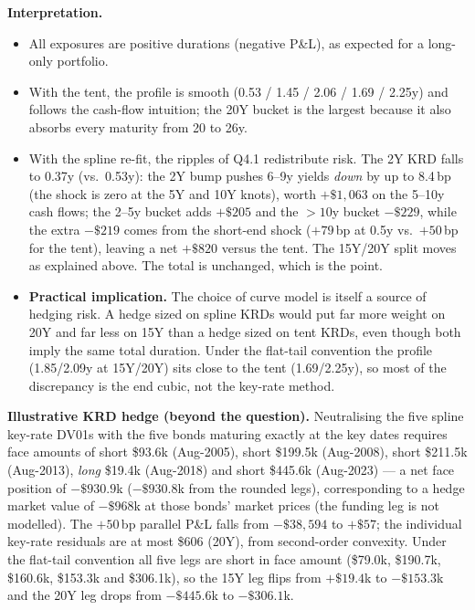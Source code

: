 \documentclass[11pt]{article}
\begin{document}
\textbf{Interpretation.}
\begin{itemize}[nosep]
\item All exposures are positive durations (negative P\&L), as expected for
a long-only portfolio.
\item With the tent, the profile is smooth (0.53 / 1.45 / 2.06 / 1.69 /
2.25y) and follows the cash-flow intuition; the 20Y bucket is the largest
because it also absorbs every maturity from 20 to 26y.
\item With the spline re-fit, the ripples of Q4.1 redistribute risk. The 2Y
KRD falls to 0.37y (vs.\ 0.53y): the 2Y bump pushes 6--9y yields \emph{down}
by up to 8.4\,bp (the shock is zero at the 5Y and 10Y knots), worth $+\$1{,}063$
on the 5--10y cash flows; the 2--5y bucket adds $+\$205$ and the $>10$y bucket
$-\$229$, while the extra $-\$219$ comes from the short-end shock ($+79$\,bp at
0.5y vs.\ $+50$\,bp for the tent), leaving a net $+\$820$ versus the tent. The
15Y/20Y split moves as explained above. The total is unchanged, which is the
point.
\item \textbf{Practical implication.} The choice of curve model is itself a
source of hedging risk. A hedge sized on spline KRDs would put far more
weight on 20Y and far less on 15Y than a hedge sized on tent KRDs, even
though both imply the same total duration. Under the flat-tail convention the
profile (1.85/2.09y at 15Y/20Y) sits close to the tent (1.69/2.25y), so most of
the discrepancy is the end cubic, not the key-rate method.
\end{itemize}

\textbf{Illustrative KRD hedge (beyond the question).} Neutralising the five
spline key-rate DV01s with the five bonds maturing exactly at the key dates
requires face amounts of short \$93.6k (Aug-2005), short \$199.5k (Aug-2008),
short \$211.5k (Aug-2013), \emph{long} \$19.4k (Aug-2018) and short \$445.6k
(Aug-2023) --- a net face position of $-\$930.9$k ($-\$930.8$k from the rounded
legs), corresponding to a hedge market value of $-\$968$k at those bonds' market
prices (the funding leg is not modelled). The $+50$\,bp parallel P\&L falls from
$-\$38{,}594$ to $+\$57$; the individual key-rate residuals are at most \$606
(20Y), from second-order convexity. Under the flat-tail convention all five
legs are short in face amount (\$79.0k, \$190.7k, \$160.6k, \$153.3k and
\$306.1k), so the 15Y leg flips from $+\$19.4$k to $-\$153.3$k and the 20Y leg
drops from $-\$445.6$k to $-\$306.1$k.

\newpage
\end{document}
